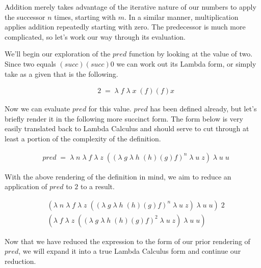 Addition merely takes advantage of the iterative nature of our numbers to apply
the successor $n$ times, starting with $m$. In a similar manner, multiplication
applies addition repeatedly starting with zero. The predecessor is much more
complicated, so let's work our way through its evaluation.

We'll begin our exploration of the $pred$ function by looking at the value of two. 
Since two equals $(succ)(succ)0$ we can work out its Lambda form, or simply take
as a given that is the following.

\begin{figure}[ht]
\caption{}\label{scheme}
\begin{align*}
& 2 \; = \; \lambda \; f \; \lambda \; x \; (f)(f)x
\end{align*}
\end{figure}

Now we can evaluate $pred$ for this value. $pred$ has been defined already, but
let's briefly render it in the following more succinct form. The form below is
very easily translated back to Lambda Calculus and should serve to cut through at
least a portion of the complexity of the definition.

\begin{figure}[ht]
\caption{}\label{scheme}
\begin{align*}
& pred \; = \; \lambda \; n \; \lambda \; f \; \lambda \; z \; ((\lambda \; g \; \lambda \; h \; (h)(g)f)^{n} \; \lambda \; u \; z) \; \lambda \; u \; u
\end{align*}
\end{figure}

With the above rendering of the definition in mind, we aim to reduce an
application of $pred$ to $2$ to a result.

\begin{figure}[ht]
\caption{}\label{scheme}
\begin{align*}
& (\lambda \; n \; \lambda \; f \; \lambda \; z \; ((\lambda \; g \; \lambda \; h \; (h)(g)f)^{n} \; \lambda \; u \; z) \; \lambda \; u \; u) \; 2
\\& (\lambda \; f \; \lambda \; z \; ((\lambda \; g \; \lambda \; h \; (h)(g)f)^2 \; \lambda \; u \; z) \; \lambda \; u \; u)
\end{align*}
\end{figure}
Now that we have reduced the expression to the form of our prior rendering of
$pred$, we will expand it into a true Lambda Calculus form and continue our
reduction.

